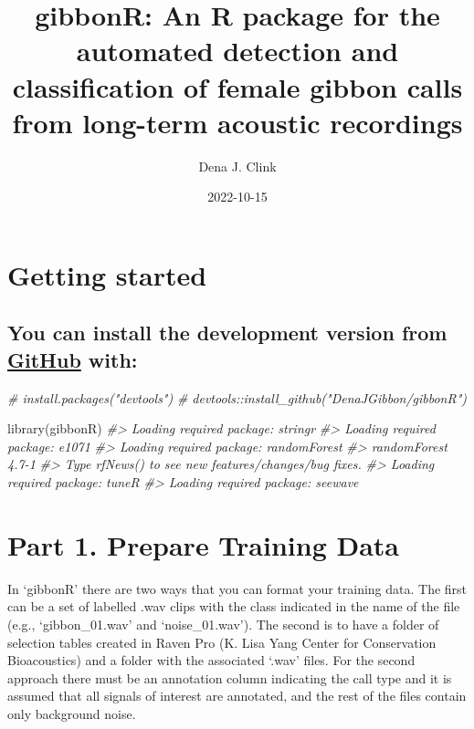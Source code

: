 \documentclass[
]{book}
\title{gibbonR: An R package for the automated detection and classification of female gibbon calls from long-term acoustic recordings}
\author{Dena J. Clink}
\date{2022-10-15}
\newenvironment{Shaded}{\begin{snugshade}}{\end{snugshade}}
\newcommand{\CommentTok}[1]{\textcolor[rgb]{0.56,0.35,0.01}{\textit{#1}}}
\newcommand{\FunctionTok}[1]{\textcolor[rgb]{0.00,0.00,0.00}{#1}}
\newcommand{\NormalTok}[1]{#1}
\begin{document}
\maketitle

{
\setcounter{tocdepth}{1}
\tableofcontents
}
\hypertarget{getting-started}{%
\chapter{Getting started}\label{getting-started}}

\hypertarget{you-can-install-the-development-version-from-github-with}{%
\section{\texorpdfstring{You can install the development version from \href{https://github.com/DenaJGibbon}{GitHub} with:}{You can install the development version from GitHub with:}}\label{you-can-install-the-development-version-from-github-with}}

\begin{Shaded}
\begin{Highlighting}[]
\CommentTok{\# install.packages("devtools")}
\CommentTok{\# devtools::install\_github("DenaJGibbon/gibbonR")}

\FunctionTok{library}\NormalTok{(gibbonR)}
\CommentTok{\#\textgreater{} Loading required package: stringr}
\CommentTok{\#\textgreater{} Loading required package: e1071}
\CommentTok{\#\textgreater{} Loading required package: randomForest}
\CommentTok{\#\textgreater{} randomForest 4.7{-}1}
\CommentTok{\#\textgreater{} Type rfNews() to see new features/changes/bug fixes.}
\CommentTok{\#\textgreater{} Loading required package: tuneR}
\CommentTok{\#\textgreater{} Loading required package: seewave}
\end{Highlighting}
\end{Shaded}

\hypertarget{part-1.-prepare-training-data}{%
\chapter{Part 1. Prepare Training Data}\label{part-1.-prepare-training-data}}

In `gibbonR' there are two ways that you can format your training data. The first can be a set of labelled .wav clips with the class indicated in the name of the file (e.g., `gibbon\_01.wav' and `noise\_01.wav'). The second is to have a folder of selection tables created in Raven Pro (K. Lisa Yang Center for Conservation Bioacoustics) and a folder with the associated `.wav' files. For the second approach there must be an annotation column indicating the call type and it is assumed that all signals of interest are annotated, and the rest of the files contain only background noise.
\end{document}
